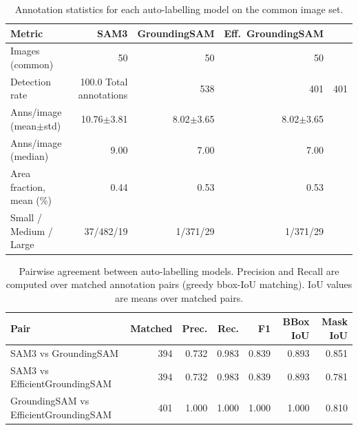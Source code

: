 \begin{table}[ht]
\centering
\caption{Annotation statistics for each auto-labelling model on the common image set.}
\label{tab:annotation_stats}
\begin{tabular}{lrrr}
\toprule
\textbf{Metric} & \textbf{SAM3} & \textbf{GroundingSAM} & \textbf{Eff.\ GroundingSAM} \\
\midrule
Images (common) & 50 & 50 & 50 \\
Detection rate & 100.0%
Total annotations & 538 & 401 & 401 \\
Anns/image (mean$\pm$std) & 10.76$\pm$3.81 & 8.02$\pm$3.65 & 8.02$\pm$3.65 \\
Anns/image (median) & 9.00 & 7.00 & 7.00 \\
Area fraction, mean (\%) & 0.44 & 0.53 & 0.53 \\
Small / Medium / Large & 37/482/19 & 1/371/29 & 1/371/29 \\
\bottomrule
\end{tabular}
\end{table}

\begin{table}[ht]
\centering
\caption{Pairwise agreement between auto-labelling models. Precision and Recall are computed over matched annotation pairs (greedy bbox-IoU matching). IoU values are means over matched pairs.}
\label{tab:pairwise}
\begin{tabular}{lrrrrrr}
\toprule
\textbf{Pair} & \textbf{Matched} & \textbf{Prec.} & \textbf{Rec.} & \textbf{F1} & \textbf{BBox IoU} & \textbf{Mask IoU} \\
\midrule
SAM3 vs GroundingSAM & 394 & 0.732 & 0.983 & 0.839 & 0.893 & 0.851 \\
SAM3 vs EfficientGroundingSAM & 394 & 0.732 & 0.983 & 0.839 & 0.893 & 0.781 \\
GroundingSAM vs EfficientGroundingSAM & 401 & 1.000 & 1.000 & 1.000 & 1.000 & 0.810 \\
\bottomrule
\end{tabular}
\end{table}